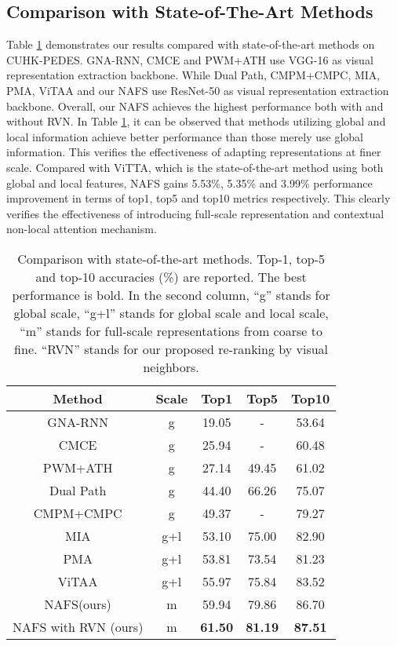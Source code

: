 \documentclass[final]{cvpr}
\begin{document}
\subsection{Comparison with State-of-The-Art Methods}
Table \ref{tab_sota_performance} demonstrates our results compared with state-of-the-art methods on CUHK-PEDES. GNA-RNN, CMCE and PWM+ATH use VGG-16\cite{simonyan2014very} as visual representation extraction backbone. 
While Dual Path, CMPM+CMPC, MIA, PMA, ViTAA and our NAFS use ResNet-50 as visual representation extraction backbone. 
Overall, our NAFS achieves the highest performance both with and without RVN. 
In Table \ref{tab_sota_performance}, it can be observed that methods utilizing global and local information achieve better performance than those merely use global information. This verifies the effectiveness of adapting representations at finer scale. 
Compared with ViTTA, which is the state-of-the-art method using both global and local features, NAFS gains 5.53\%, 5.35\% and 3.99\% performance improvement in terms of top1, top5 and top10 metrics respectively. This clearly verifies the effectiveness of introducing full-scale representation and contextual non-local attention mechanism.

\begin{table}
\caption{Comparison with state-of-the-art methods. Top-1,
top-5 and top-10 accuracies (\%) are reported. 
The best performance is bold. 
In the second column, ``g'' stands for global scale, ``g+l'' stands for global scale and local scale, ``m'' stands for full-scale representations from coarse to fine. ``RVN'' stands for our proposed re-ranking by visual neighbors.}
\small
\centering
\label{tab_sota_performance}
\begin{tabular}{c|c|ccc}
\hline
Method& Scale& Top1& Top5& Top10\\
\hline
GNA-RNN \cite{li2017person}& g& 19.05& -& 53.64\\
CMCE \cite{li2017identity}& g& 25.94& -& 60.48\\
PWM+ATH \cite{chen2018improving}& g& 27.14& 49.45& 61.02\\
Dual Path \cite{zheng2020dual}& g& 44.40& 66.26& 75.07\\
CMPM+CMPC \cite{zhang2018deep}& g& 49.37& -& 79.27\\
\hline
MIA \cite{niu2020improving}& g+l& 53.10& 75.00& 82.90\\
PMA \cite{jing2020pose}& g+l& 53.81& 73.54& 81.23\\
ViTAA \cite{wang2020vitaa}& g+l& 55.97& 75.84& 83.52\\
\hline
NAFS(ours) & m&  59.94& 79.86& 86.70\\
NAFS with RVN (ours)& m&  \textbf{61.50}& \textbf{81.19}& \textbf{87.51}\\
\hline
\end{tabular}
\end{table}
\end{document}
